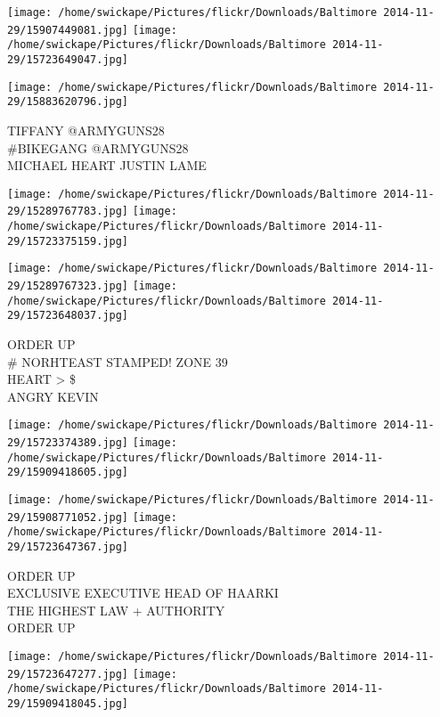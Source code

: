 \documentclass[10pt,letterpaper]{article}
\begin{document}
\texttt{[image: /home/swickape/Pictures/flickr/Downloads/Baltimore 2014-11-29/15907449081.jpg]}
\texttt{[image: /home/swickape/Pictures/flickr/Downloads/Baltimore 2014-11-29/15723649047.jpg]}

\vspace{0.25in}
\texttt{[image: /home/swickape/Pictures/flickr/Downloads/Baltimore 2014-11-29/15883620796.jpg]}

TIFFANY @ARMYGUNS28\\
\#BIKEGANG @ARMYGUNS28\\
MICHAEL HEART JUSTIN LAME\\
\pagebreak

\texttt{[image: /home/swickape/Pictures/flickr/Downloads/Baltimore 2014-11-29/15289767783.jpg]}
\texttt{[image: /home/swickape/Pictures/flickr/Downloads/Baltimore 2014-11-29/15723375159.jpg]}

\texttt{[image: /home/swickape/Pictures/flickr/Downloads/Baltimore 2014-11-29/15289767323.jpg]}
\texttt{[image: /home/swickape/Pictures/flickr/Downloads/Baltimore 2014-11-29/15723648037.jpg]}

ORDER UP\\
\# NORHTEAST STAMPED! ZONE 39\\
HEART > \$\\
ANGRY KEVIN\\
\pagebreak

\texttt{[image: /home/swickape/Pictures/flickr/Downloads/Baltimore 2014-11-29/15723374389.jpg]}
\texttt{[image: /home/swickape/Pictures/flickr/Downloads/Baltimore 2014-11-29/15909418605.jpg]}

\texttt{[image: /home/swickape/Pictures/flickr/Downloads/Baltimore 2014-11-29/15908771052.jpg]}
\texttt{[image: /home/swickape/Pictures/flickr/Downloads/Baltimore 2014-11-29/15723647367.jpg]}

ORDER UP\\
EXCLUSIVE EXECUTIVE HEAD OF HAARKI\\
THE HIGHEST LAW + AUTHORITY\\
ORDER UP\\
\pagebreak

\texttt{[image: /home/swickape/Pictures/flickr/Downloads/Baltimore 2014-11-29/15723647277.jpg]}
\texttt{[image: /home/swickape/Pictures/flickr/Downloads/Baltimore 2014-11-29/15909418045.jpg]}
\end{document}
